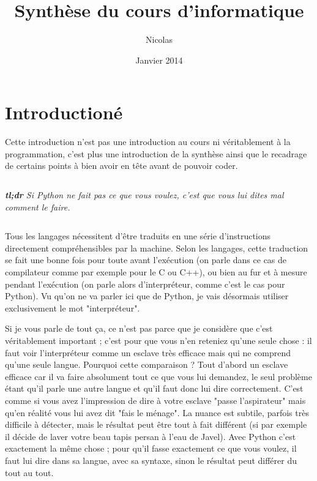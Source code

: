\documentclass[a4paper, 12pt, french]{article}
\author{Nicolas \bsc{Englebert}}
\title{Synthèse du cours d'informatique}
\date{Janvier 2014}
\begin{document}
\maketitle
\tableofcontents

\section{Introductioné}
Cette introduction n'est pas une introduction au cours ni véritablement à la programmation, c'est plus une introduction de la synthèse ainsi que le recadrage de certains points à bien avoir en tête avant de pouvoir coder.

$ $

\textit{\textbf{tl;dr} Si Python ne fait pas ce que vous voulez, c'est que vous lui dites mal comment le faire.}

$ $

Tous les langages nécessitent d'être traduits en une série d'instructions directement compréhensibles par la machine. Selon les langages, cette traduction se fait une bonne fois pour toute avant l'exécution (on parle dans ce cas de compilateur comme par exemple pour le C ou C++), ou bien au fur et à mesure pendant l'exécution (on parle alors d'interpréteur, comme c'est le cas pour Python). Vu qu'on ne va parler ici que de Python, je vais désormais utiliser exclusivement le mot "interpréteur".

Si je vous parle de tout ça, ce n'est pas parce que je considère que c'est véritablement important ; c'est pour que vous n'en reteniez qu'une seule chose : il faut voir l'interpréteur comme un esclave très efficace mais qui ne comprend qu'une seule langue. Pourquoi cette comparaison ? Tout d'abord un esclave efficace car il va faire absolument tout ce que vous lui demandez, le seul problème étant qu'il parle une autre langue et qu'il faut donc lui dire correctement. C'est comme si vous avez l'impression de dire à votre esclave "passe l'aspirateur" mais qu'en réalité vous lui avez dit "fais le ménage". La nuance est subtile, parfois très difficile à détecter, mais le résultat peut être tout à fait différent (si par exemple il décide de laver votre beau tapis persan à l'eau de Javel). Avec Python c'est exactement la même chose ; pour qu'il fasse exactement ce que vous voulez, il faut lui dire dans sa langue, avec sa syntaxe, sinon le résultat peut différer du tout au tout.
\end{document}
